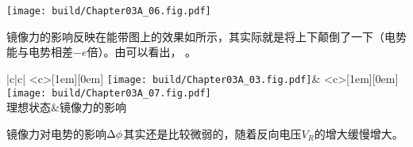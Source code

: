 \begin{Figure}[镜像力对电势曲线的影响]
    \texttt{[image: build/Chapter03A\_06.fig.pdf]}
\end{Figure}

镜像力的影响反映在能带图上的效果如所示，其实际就是将上下颠倒了一下（电势能与电势相差$-e$倍）。由可以看出，
。

\begin{Table}[镜像力对势垒的影响]{|c|c|}
    \xcell<c>[1em][0em]
    {\texttt{[image: build/Chapter03A\_03.fig.pdf]}}&
    \xcell<c>[1em][0em]
    {\texttt{[image: build/Chapter03A\_07.fig.pdf]}}\\
    理想状态&镜像力的影响\\
\end{Table}

镜像力对电势的影响$\Delta{\phi}$其实还是比较微弱的，随着反向电压$V_R$的增大缓慢增大。
